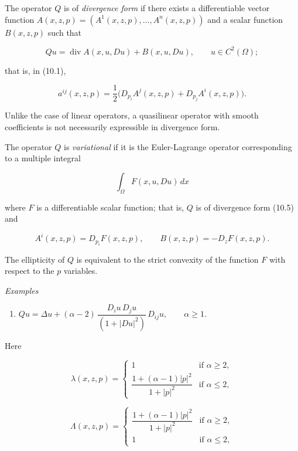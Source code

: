 

The operator $Q$ is of \textit{divergence form} if there exists a differentiable vector function
$A(x, z, p) = (A^1(x, z, p), \dots, A^n(x, z, p))$ and a scalar function $B(x, z, p)$ such that

\begin{equation}
Q u = \operatorname{div} A(x, u, D u) + B(x, u, D u), \qquad u \in C^2(\Omega);
\tag{10.5}
\end{equation}

that is, in (10.1),

\[
a^{ij}(x, z, p) = \frac{1}{2}\bigl(D_{p_i}A^j(x, z, p) + D_{p_j}A^i(x, z, p)\bigr).
\]

Unlike the case of linear operators, a quasilinear operator with smooth coefficients
is not necessarily expressible in divergence form.

The operator $Q$ is \textit{variational} if it is the Euler-Lagrange operator corresponding
to a multiple integral

\[
\int_{\Omega} F(x, u, D u)\,dx
\]

where $F$ is a differentiable scalar function; that is, $Q$ is of divergence form (10.5) and

\begin{equation}
A^i(x, z, p) = D_{p_i}F(x, z, p), \qquad B(x, z, p) = -D_z F(x, z, p).
\tag{10.6}
\end{equation}

The ellipticity of $Q$ is equivalent to the strict convexity of the function $F$ with
respect to the $p$ variables.

\textit{Examples}

\begin{enumerate}
\item[(i)] $Q u = \Delta u + (\alpha - 2)\,\dfrac{D_i u\,D_j u}{(1 + |D u|^2)}\,D_{ij}u,\qquad \alpha \geq 1.$
\end{enumerate}

Here

\[
\lambda(x, z, p)=
\begin{cases}
1 & \text{if } \alpha \geq 2,\\[6pt]
\dfrac{1+(\alpha-1)|p|^2}{1+|p|^2} & \text{if } \alpha \leq 2,
\end{cases}
\]

\[
\Lambda(x, z, p)=
\begin{cases}
\dfrac{1+(\alpha-1)|p|^2}{1+|p|^2} & \text{if } \alpha \geq 2,\\[6pt]
1 & \text{if } \alpha \leq 2,
\end{cases}
\]

